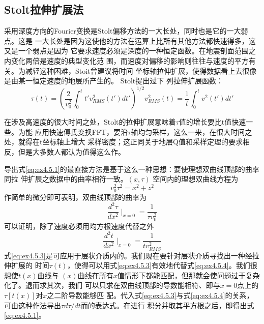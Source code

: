 \subsection{Stolt拉伸扩展法}
\label{sec:4.5.4}

采用深度方向的Fourier变换是Stolt偏移方法的一大长处，同时也是它的一大弱点。这是
一大长处是因为这使他的方法在运算上比所有其他方法都快速得多，这又是一个弱点是因为
它要求速度必须是深度的一种恒定函数。在地震剖面范围之内变化两倍是速度的典型变化范
围，而速度对偏移的影响则往往与速度的平方有关。为减轻这种困难，Stoit曾建议将时间
坐标轴拉伸扩展，使得数据看上去很像是由某一恒定速度的地层所产生的。
Stolt提出过下 列拉伸扩展函数：
\begin{subequations}
\begin{equation}
\tau(t)=(\frac{2}{v_0^2}\int_0^t t'v_{RMS}^2(t')dt')^{1/2}
\label{eq:ex4.5.1a}
\end{equation}
\begin{equation}
v_{RMS}^2(t)=\frac{1}{t}\int_0^t v^2(t')dt'
\label{eq:ex4.5.1b}
\end{equation}
\label{eq:ex4.5.1}
\end{subequations}

在涉及高速度的很大时间之处，Stolt的拉伸扩展意味着$\tau$值的增长要比t值快速一些。为能
应用快速傅氏变换FFT，要沿$\tau$轴均匀采样，这么一来，在很大时间之处，就得在t坐标轴上增大
采样密度；这正同关于地层Q值和采样定理的要求相反，但是大多数人都认为值得这么作。

导出式\ref{eq:ex4.5.1}的最直接方法是基于这么一种思想：要使理想双曲线顶部的曲率同拉
伸扩展之数据中的曲率相符一致。$(x,\tau)$ 空间内的理想双曲线方程为
\begin{equation}
v_0^2\tau^2=x^2+z^2
\label{eq:ex4.5.2}
\end{equation}
作简单的微分即可表明，双曲线顶部的曲率为
\begin{equation}
\frac{d^2\tau}{dx^2}\mid_{x=0}=\frac{1}{\tau v_0^2}
\label{eq:ex4.5.3}
\end{equation}
可以证明，除了速度必须用均方根速度代替之外
\begin{equation}
\frac{d^2 t}{dx^2}\mid_{x=0}=\frac{1}{tv_{RMS}^2}
\label{eq:ex4.5.4}
\end{equation}
式\ref{eq:ex4.5.3}是可应用于层状介质内的。我们现在要针对层状介质寻找出一种经拉伸扩展的
时间$\tau(t)$，使得可以用式\ref{eq:ex4.5.3}有效地代替式\ref{eq:ex4.5.4}。我们很想使$t(x)$曲线与
$(x)$曲线在所有$x$值情形下都能匹配，但那就会使问题过于复杂化了。退而求其次，我们
可以只求在双曲线顶部的导数能相符、即与$x=0$点上的$\tau[t(x)]$对$x$之二阶导数能够匹
配。代入式\ref{eq:ex4.5.3}与式\ref{eq:ex4.5.4}的关系，可由这种作法导出$\tau d\tau/dt$而的表达式。在进行
积分并取其平方根之后，即得出式\ref{eq:ex4.5.1}。

